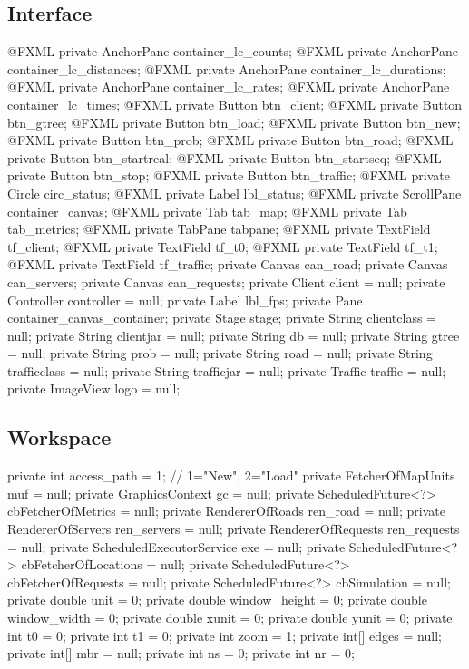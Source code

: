 \subsection{Interface}
\nwenddocs{}\plusendmoddef
@FXML private AnchorPane container_lc_counts;
@FXML private AnchorPane container_lc_distances;
@FXML private AnchorPane container_lc_durations;
@FXML private AnchorPane container_lc_rates;
@FXML private AnchorPane container_lc_times;
@FXML private Button btn_client;
@FXML private Button btn_gtree;
@FXML private Button btn_load;
@FXML private Button btn_new;
@FXML private Button btn_prob;
@FXML private Button btn_road;
@FXML private Button btn_startreal;
@FXML private Button btn_startseq;
@FXML private Button btn_stop;
@FXML private Button btn_traffic;
@FXML private Circle circ_status;
@FXML private Label lbl_status;
@FXML private ScrollPane container_canvas;
@FXML private Tab tab_map;
@FXML private Tab tab_metrics;
@FXML private TabPane tabpane;
@FXML private TextField tf_client;
@FXML private TextField tf_t0;
@FXML private TextField tf_t1;
@FXML private TextField tf_traffic;
private Canvas can_road;
private Canvas can_servers;
private Canvas can_requests;
private Client client = null;
private Controller controller = null;
private Label lbl_fps;
private Pane container_canvas_container;
private Stage stage;
private String clientclass = null;
private String clientjar = null;
private String db = null;
private String gtree = null;
private String prob = null;
private String road = null;
private String trafficclass = null;
private String trafficjar = null;
private Traffic traffic = null;
private ImageView logo = null;
\nwendcode{}\nwdocspar

\subsection{Workspace}
\nwenddocs{}\plusendmoddef
private int access_path = 1;  // 1="New", 2="Load"
private FetcherOfMapUnits muf = null;
private GraphicsContext gc = null;
private ScheduledFuture<?> cbFetcherOfMetrics = null;
private RendererOfRoads ren_road = null;
private RendererOfServers ren_servers = null;
private RendererOfRequests ren_requests = null;
private ScheduledExecutorService exe = null;
private ScheduledFuture<?> cbFetcherOfLocations = null;
private ScheduledFuture<?> cbFetcherOfRequests = null;
private ScheduledFuture<?> cbSimulation = null;
private double unit = 0;
private double window_height = 0;
private double window_width = 0;
private double xunit = 0;
private double yunit = 0;
private int t0 = 0;
private int t1 = 0;
private int zoom = 1;
private int[] edges = null;
private int[] mbr = null;
private int ns = 0;
private int nr = 0;
\nwendcode{}\nwdocspar


